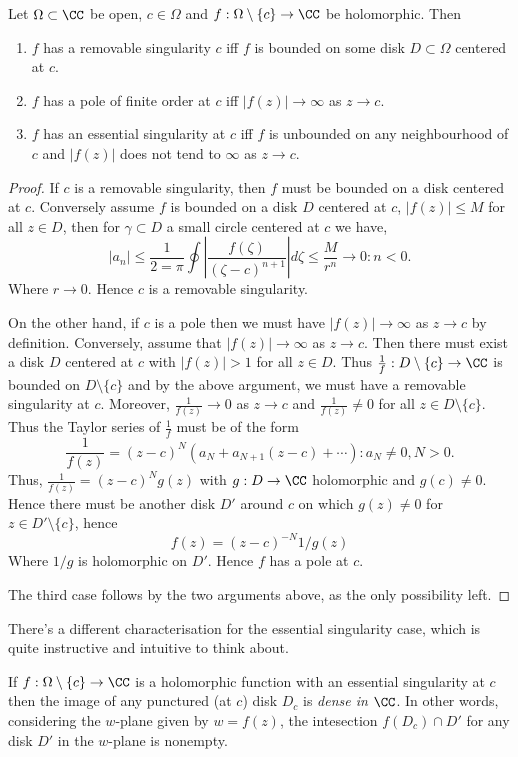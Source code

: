 \begin{proposition}
  Let $\Omega\subset\CC$ be open, $c\in\Omega$ and
  $f:\Omega\setminus\{c\}\to\CC$ be holomorphic. Then
  \begin{enumerate}
    \item $f$ has a removable singularity $c$ iff $f$ is bounded on some disk
      $D\subset \Omega$ centered at $c$.
    \item $f$ has a pole of finite order at $c$ iff $|f(z)|\to\infty$ as $z\to
      c$.
    \item $f$ has an essential singularity at $c$ iff $f$ is unbounded on any
      neighbourhood of $c$ and $|f(z)|$ does not tend to $\infty$ as $z\to c$.
  \end{enumerate}
  \label{<+label+>}
\end{proposition}
\begin{proof}
  If $c$ is a removable singularity, then $f$ must be bounded on a disk centered
  at $c$. Conversely assume $f$ is bounded on a disk $D$ centered at $c$,
  $|f(z)|\leq M$ for all $z\in D$, then for $\gamma\subset D$ a small circle
  centered at $c$ we have,
  \[|a_n|\leq \frac{1}{2=\pi} \oint |\frac{f(\zeta)}{(\zeta-c)^{n+1}}|d\zeta
  \leq \frac{M}{r^n} \to 0 : n<0.\]
  Where $r\to 0$. Hence $c$ is a removable singularity.

  On the other hand, if $c$ is a pole then we must have $|f(z)|\to\infty$ as
  $z\to c$ by definition. Conversely, assume that $|f(z)|\to\infty$ as $z\to c$.
  Then there must exist a disk $D$ centered at $c$ with $|f(z)|>1$ for all $z\in
  D$. Thus $\frac{1}{f}:D\setminus\{c\}\to \CC$ is bounded on $D\setminus\{c\}$
  and by the above argument, we must have a removable singularity at $c$.
  Moreover, $\frac{1}{f(z)}\to 0$ as $z\to c$ and $\frac{1}{f(z)}\neq 0$ for all
  $z\in D\setminus\{c\}$. Thus the Taylor series of $\frac{1}{f}$ must be of the
  form 
  \[\frac{1}{f(z)}=(z-c)^N (a_N+ a_{N+1}(z-c) + \cdots) : a_N\neq 0, N>0.\]
  Thus, $\frac{1}{f(z)} = (z-c)^N g(z)$ with $g:D\to\CC$ holomorphic and
  $g(c)\neq 0$. Hence there must be another disk $D'$ around $c$ on which
  $g(z)\neq 0$ for $z\in D'\setminus\{c\}$, hence 
  \[f(z)=(z-c)^{-N} 1/g(z)\]
  Where $1/g$ is holomorphic on $D'$. Hence $f$ has a pole at $c$.

  The third case follows by the two arguments above, as the only possibility
  left.
\end{proof}
There's a different characterisation for the essential singularity case, which
is quite instructive and intuitive to think about. 
\begin{theorem}
  If $f:\Omega\setminus\{c\}\to\CC$ is a holomorphic function with an essential
  singularity at $c$ then the image of any punctured (at $c$) disk $D_c$ is
  \emph{dense in $\CC$}. In other words, considering the $w$-plane given by
  $w=f(z)$, the intesection $f(D_c)\cap D'$ for any disk $D'$ in the $w$-plane
  is nonempty.
  \label{def:CasarotiWeirstrass}
\end{theorem}

